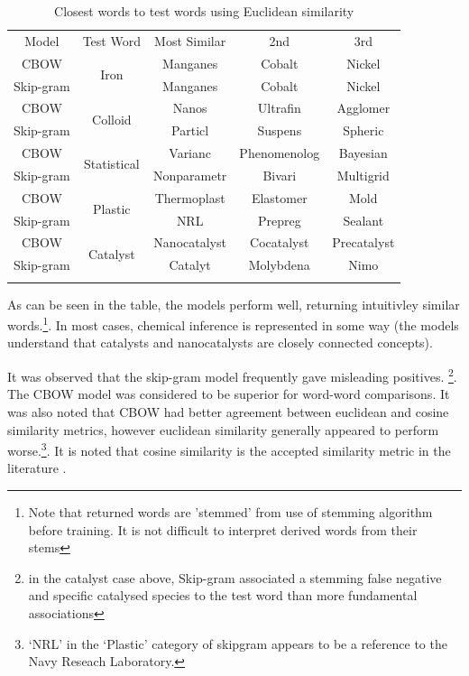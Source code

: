 \begin{table}[h!]
\begin{center}
\label{tab:EUCLIDSIMS}
\caption{Closest words to test words using Euclidean similarity}
\begin{tabular}{||c||c|c|c|c||}
\hline
Model     & Test Word              & Most Similar & 2nd & 3rd \\ \hhline{||=||=|=|=|=||}
CBOW      & \multirow{2}{*}{Iron} & Manganes             &  Cobalt   &   Nickel  \\ \cline{1-1} \cline{3-5} 
Skip-gram &                   &  Manganes            &   Cobalt  &  Nickel   \\ 
\hhline{||=||=|=|=|=||}
CBOW      & \multirow{2}{*}{Colloid} & Nanos             &  Ultrafin   &   Agglomer  \\ \cline{1-1} \cline{3-5} 
Skip-gram &                   &  Particl            &   Suspens  &  Spheric   \\ 
\hhline{||=||=|=|=|=||}
CBOW      & \multirow{2}{*}{Statistical} & Varianc             &  Phenomenolog   &   Bayesian  \\ \cline{1-1} \cline{3-5} 
Skip-gram &                   &  Nonparametr            &   Bivari  &  Multigrid   \\ 
\hhline{||=||=|=|=|=||}
CBOW      & \multirow{2}{*}{Plastic} & Thermoplast             &  Elastomer   & Mold    \\ \cline{1-1} \cline{3-5} 
Skip-gram &                   &  NRL            &   Prepreg  &  Sealant   \\ 
\hhline{||=||=|=|=|=||}
CBOW      & \multirow{2}{*}{Catalyst} & Nanocatalyst             &  Cocatalyst   & Precatalyst    \\ \cline{1-1} \cline{3-5} 
Skip-gram &                   &  Catalyt            &   Molybdena  &  Nimo   \\ 
\hhline{||=||=|=|=|=||}
\end{tabular}
\end{center}
\end{table}
As can be seen in the table, the models perform well, returning intuitivley similar words.\footnote{Note that returned words are 'stemmed' from use of stemming algorithm before training. It is not difficult to interpret derived words from their stems}. In most cases, chemical inference is represented in some way (the models understand that catalysts and nanocatalysts are closely connected concepts).

It was observed that the skip-gram model frequently gave misleading positives. \footnote{in the catalyst case above, Skip-gram associated a stemming false negative and specific catalysed species to the test word than more fundamental associations}. The CBOW model was considered to be superior for word-word comparisons. It was also noted that CBOW had better agreement between euclidean and cosine similarity metrics, however euclidean similarity generally appeared to perform worse.\footnote{`NRL' in the `Plastic' category of skipgram appears to be a reference to the Navy Reseach Laboratory. }. It is noted that cosine similarity is the accepted similarity metric in the literature \cite{word2vec1} \cite{word2vec2} \cite{doc2vec}.

